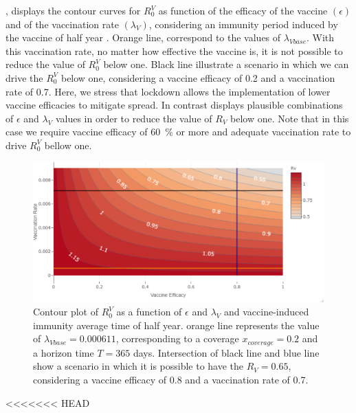 , displays the contour curves for $ R_0^V $ as function
of the efficacy of the vaccine $ (\epsilon) $ and of the vaccination rate 
$(\lambda_V)$, considering an immunity period induced by the vaccine of half year . 
Orange line, correspond to the values of $\lambda_{Vbase}$. With this vaccination
rate, no matter how effective the vaccine is, it is not possible
to reduce the value of $R_0^V$ below one. Black line illustrate a scenario in
which we can drive the $R_0^V$  below one, considering a vaccine
efficacy of \num{0.2} and a  vaccination rate of \num{0.7}.
Here, we stress that lockdown allows the implementation of lower vaccine
efficacies to mitigate spread.
In contrast  displays  plausible
combinations of $\epsilon$ and $\lambda_V$ values
in order to reduce the value of $R_V$ below one. Note that in this case
we require vaccine efficacy of \SI{60}{\percent} or more and
adequate vaccination rate to drive $R_0^V$ bellow one.
\begin{figure}[tbh]
    \centering
      \includegraphics[scale=0.6, keepaspectratio]{Figures/Rv_contour}
    \caption{
    Contour plot  of $R_0^V$ as a function of $ \epsilon $ and $ \lambda_V $ and  
        vaccine-induced
        immunity average time of half year. orange line represents the 
        value of $\lambda_{Vbase}=\num{0.000611}$, corresponding to a coverage 
        $x_{coverage} = \num{0.2}$ and a horizon time $T=\num{365}$ days.
        Intersection of black line and blue line show a scenario in which it is
        possible to have the $R_V=0.65$, considering a vaccine efficacy of 
        \num{0.8} and a vaccination rate 
        of \num{0.7}.}
    \label{fig:rvcontour1}
\end{figure}
<<<<<<< HEAD
%
